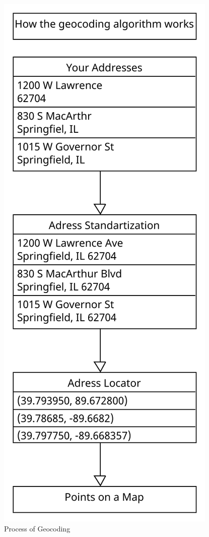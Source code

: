 \documentclass[10pt,oneside,english,a4paper]{article}
\begin{document}
\begin{figure}[h]
	\centering
	\includegraphics[scale=0.45]{diagram1.pdf}
	\caption{Process of Geocoding}
	\label{fig:geocoding}
\end{figure}
\end{document}

